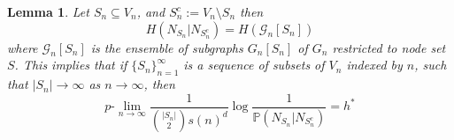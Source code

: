 \documentclass[conference,letterpaper]{IEEEtran}
\newtheorem{lemma}{Lemma}
\newcommand{\tti}{\rightarrow\infty}
\newcommand{\graph}{\mathcal{G}}
\newcommand{\prob}[1]{\mathbb{P}\left(#1\right)}
\newcommand{\plim}[0]{p\mbox{-}\lim}
\begin{document}
\begin{lemma}
    \label{thm:nbhd_reduction}
    Let $S_n \subseteq V_n$, and $S_n^c := V_n \setminus S_n$ then
    \begin{equation}
        H(N_{S_n}|N_{S_n^c}) = H(\graph_n[S_n])
    \end{equation}
    where $\graph_n[S_n]$ is the ensemble of subgraphs $G_n[S_n]$ of $G_n$ restricted to node set $S$. This implies that if $\{S_n\}_{n=1}^\infty$ is a sequence of subsets of $V_n$ indexed by $n$, such that $|S_n| \to \infty$ as $n\tti$, then
    \begin{equation}
        \label{eq:nbhd_aep}
        \plim_{n\tti} \frac{1}{\binom{|S_n|}{2}s(n)^d}\log \frac{1}{\prob{N_{S_n}|N_{S_n^c}}} = h^* 
    \end{equation}
\end{lemma}
\end{document}
